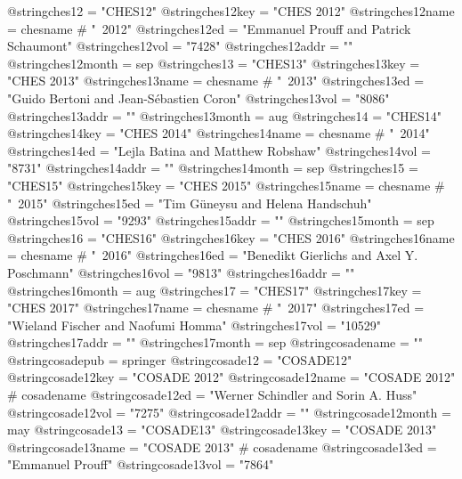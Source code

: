 @string{ches12 =                "CHES12"}
@string{ches12key =             "CHES 2012"}
@string{ches12name =            chesname # "~2012"}
@string{ches12ed =              "Emmanuel Prouff and Patrick Schaumont"}
@string{ches12vol =             "7428"}
@string{ches12addr =            ""}
@string{ches12month =           sep}
@string{ches13 =                "CHES13"}
@string{ches13key =             "CHES 2013"}
@string{ches13name =            chesname # "~2013"}
@string{ches13ed =              "Guido Bertoni and Jean-S{\'e}bastien Coron"}
@string{ches13vol =             "8086"}
@string{ches13addr =            ""}
@string{ches13month =           aug}
@string{ches14 =                "CHES14"}
@string{ches14key =             "CHES 2014"}
@string{ches14name =            chesname # "~2014"}
@string{ches14ed =              "Lejla Batina and Matthew Robshaw"}
@string{ches14vol =             "8731"}
@string{ches14addr =            ""}
@string{ches14month =           sep}
@string{ches15 =                "CHES15"}
@string{ches15key =             "CHES 2015"}
@string{ches15name =            chesname # "~2015"}
@string{ches15ed =              "Tim G{\"u}neysu and Helena Handschuh"}
@string{ches15vol =             "9293"}
@string{ches15addr =            ""}
@string{ches15month =           sep}
@string{ches16 =                "CHES16"}
@string{ches16key =             "CHES 2016"}
@string{ches16name =            chesname # "~2016"}
@string{ches16ed =              "Benedikt Gierlichs and Axel Y. Poschmann"}
@string{ches16vol =             "9813"}
@string{ches16addr =            ""}
@string{ches16month =           aug}
@string{ches17 =                "CHES17"}
@string{ches17key =             "CHES 2017"}
@string{ches17name =            chesname # "~2017"}
@string{ches17ed =              "Wieland Fischer and Naofumi Homma"}
@string{ches17vol =             "10529"}
@string{ches17addr =            ""}
@string{ches17month =           sep}
@string{cosadename =            ""}
@string{cosadepub =             springer}
@string{cosade12 =              "COSADE12"}
@string{cosade12key =           "COSADE 2012"}
@string{cosade12name =          "COSADE 2012" # cosadename}
@string{cosade12ed =            "Werner Schindler and Sorin A. Huss"}
@string{cosade12vol =           "7275"}
@string{cosade12addr =          ""}
@string{cosade12month =         may}
@string{cosade13 =              "COSADE13"}
@string{cosade13key =           "COSADE 2013"}
@string{cosade13name =          "COSADE 2013" # cosadename}
@string{cosade13ed =            "Emmanuel Prouff"}
@string{cosade13vol =           "7864"}
